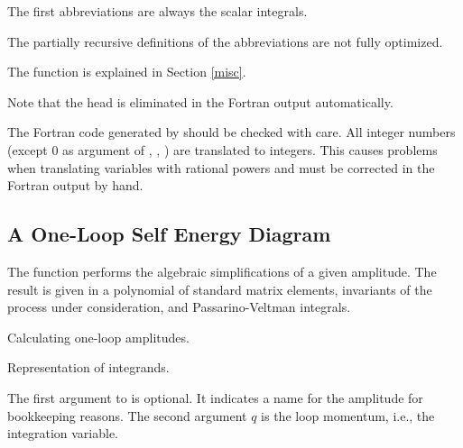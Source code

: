 {The first abbreviations are always the scalar integrals.

The partially recursive definitions of the 
abbreviations are not fully optimized. 

The function  is explained in Section 
\ref{misc}.

Note that the head  is eliminated in the 
Fortran output automatically.
}
\enom
The Fortran code generated by  should be checked with care.
All integer numbers (except 0 as argument of , , ) 
are translated to integers. This causes problems when translating 
variables with rational powers and must be corrected in the Fortran 
output by hand.

\subsection{A One-Loop Self Energy Diagram}
\label{self}
The function  performs the algebraic simplifications 
of a given amplitude. The result is given in a polynomial of standard 
matrix elements, invariants of the process under consideration, 
and Passarino-Veltman integrals.

 {Calculating one-loop amplitudes.}

 {Representation of integrands.}

The first argument to  is optional. It indicates  a name
for the amplitude for bookkeeping reasons. 
The second argument $q$ is the loop momentum, i.e., the integration 
variable. 

